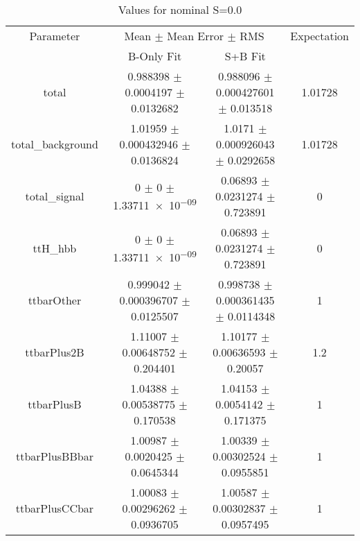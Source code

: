 \begin{table}
\centering
\caption{Values for nominal S=0.0}
\begin{tabular}{cccc}
\toprule
Parameter & \multicolumn{2}{c}{Mean $\pm$ Mean Error $\pm$ RMS} & Expectation\\
 & B-Only Fit & S+B Fit & \\
\midrule
total & \num{0.988398} $\pm$ \num{0.0004197} $\pm$ \num{0.0132682} & \num{0.988096} $\pm$ \num{0.000427601} $\pm$ \num{0.013518} & \num{1.01728}\\
total\_background & \num{1.01959} $\pm$ \num{0.000432946} $\pm$ \num{0.0136824} & \num{1.0171} $\pm$ \num{0.000926043} $\pm$ \num{0.0292658} & \num{1.01728}\\
total\_signal & \num{0} $\pm$ \num{0} $\pm$ \num{1.33711e-09} & \num{0.06893} $\pm$ \num{0.0231274} $\pm$ \num{0.723891} & \num{0}\\
ttH\_hbb & \num{0} $\pm$ \num{0} $\pm$ \num{1.33711e-09} & \num{0.06893} $\pm$ \num{0.0231274} $\pm$ \num{0.723891} & \num{0}\\
ttbarOther & \num{0.999042} $\pm$ \num{0.000396707} $\pm$ \num{0.0125507} & \num{0.998738} $\pm$ \num{0.000361435} $\pm$ \num{0.0114348} & \num{1}\\
ttbarPlus2B & \num{1.11007} $\pm$ \num{0.00648752} $\pm$ \num{0.204401} & \num{1.10177} $\pm$ \num{0.00636593} $\pm$ \num{0.20057} & \num{1.2}\\
ttbarPlusB & \num{1.04388} $\pm$ \num{0.00538775} $\pm$ \num{0.170538} & \num{1.04153} $\pm$ \num{0.0054142} $\pm$ \num{0.171375} & \num{1}\\
ttbarPlusBBbar & \num{1.00987} $\pm$ \num{0.0020425} $\pm$ \num{0.0645344} & \num{1.00339} $\pm$ \num{0.00302524} $\pm$ \num{0.0955851} & \num{1}\\
ttbarPlusCCbar & \num{1.00083} $\pm$ \num{0.00296262} $\pm$ \num{0.0936705} & \num{1.00587} $\pm$ \num{0.00302837} $\pm$ \num{0.0957495} & \num{1}\\
\bottomrule
\end{tabular}
\end{table}